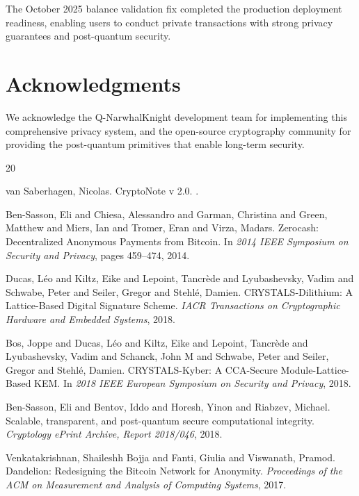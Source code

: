 \documentclass[12pt,a4paper]{article}
\begin{document}
The October 2025 balance validation fix completed the production deployment readiness, enabling users to conduct private transactions with strong privacy guarantees and post-quantum security.

\section*{Acknowledgments}

We acknowledge the Q-NarwhalKnight development team for implementing this comprehensive privacy system, and the open-source cryptography community for providing the post-quantum primitives that enable long-term security.


\begin{thebibliography}{20}

van Saberhagen, Nicolas.
\newblock CryptoNote v 2.0.
.

Ben-Sasson, Eli and Chiesa, Alessandro and Garman, Christina and Green, Matthew and Miers, Ian and Tromer, Eran and Virza, Madars.
\newblock Zerocash: Decentralized Anonymous Payments from Bitcoin.
\newblock In \emph{2014 IEEE Symposium on Security and Privacy}, pages 459--474, 2014.

Ducas, Léo and Kiltz, Eike and Lepoint, Tancrède and Lyubashevsky, Vadim and Schwabe, Peter and Seiler, Gregor and Stehlé, Damien.
\newblock CRYSTALS-Dilithium: A Lattice-Based Digital Signature Scheme.
\newblock \emph{IACR Transactions on Cryptographic Hardware and Embedded Systems}, 2018.

Bos, Joppe and Ducas, Léo and Kiltz, Eike and Lepoint, Tancrède and Lyubashevsky, Vadim and Schanck, John M and Schwabe, Peter and Seiler, Gregor and Stehlé, Damien.
\newblock CRYSTALS-Kyber: A CCA-Secure Module-Lattice-Based KEM.
\newblock In \emph{2018 IEEE European Symposium on Security and Privacy}, 2018.

Ben-Sasson, Eli and Bentov, Iddo and Horesh, Yinon and Riabzev, Michael.
\newblock Scalable, transparent, and post-quantum secure computational integrity.
\newblock \emph{Cryptology ePrint Archive, Report 2018/046}, 2018.

Venkatakrishnan, Shaileshh Bojja and Fanti, Giulia and Viswanath, Pramod.
\newblock Dandelion: Redesigning the Bitcoin Network for Anonymity.
\newblock \emph{Proceedings of the ACM on Measurement and Analysis of Computing Systems}, 2017.


\end{thebibliography}
\end{document}
